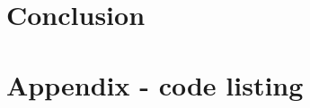 \documentclass[12pt,a4paper]{article}
\begin{document}
\section{Conclusion}

\appendix
\section{Appendix - code listing}


\nocite{*}


\end{document}
